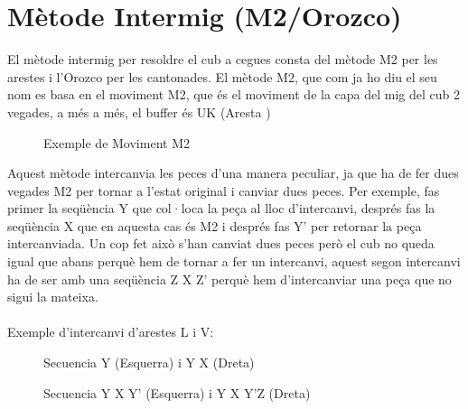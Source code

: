 \section{Mètode Intermig (M2/Orozco)}

El mètode intermig per resoldre el cub a cegues consta del mètode M2 per les arestes i l'Orozco per les cantonades.
El mètode M2, que com ja ho diu el seu nom es basa en el moviment M2, que és el moviment de la capa del mig del cub 2 vegades, a més a més, el buffer és UK (Aresta )

\begin{figure}[h]
    \centering\RubikCubeSolvedWY
    \caption{Exemple de Moviment M2}
\end{figure}
    
Aquest mètode intercanvia les peces d'una manera peculiar, ja que ha de fer dues vegades M2 per tornar a l'estat original i canviar dues peces. Per exemple, fas primer la seqüència Y que col·loca la peça al lloc d'intercanvi, després fas la seqüència X que en aquesta cas és M2 i després fas Y' per retornar la peça intercanviada. Un cop fet això s'han canviat dues peces però el cub no queda igual que abans perquè hem de tornar a fer un intercanvi, aquest segon intercanvi ha de ser amb una seqüència Z X Z' perquè hem d'intercanviar una peça que no sigui la mateixa.\\\\Exemple d'intercanvi d'arestes L i V:

\begin{figure}[htbp]
    \centering
    \begin{subfigure}
        \centering\RubikCubeSolvedWY
    \end{subfigure}
    \begin{subfigure}
        \centering\RubikCubeSolvedWY
    \end{subfigure}
    \caption{Secuencia Y (Esquerra) i Y X (Dreta)}
\end{figure}

\begin{figure}[htbp]
    \centering
    \begin{subfigure}
        \centering\RubikCubeSolvedWY
    \end{subfigure}
    \begin{subfigure}
        \centering\RubikCubeSolvedWY
    \end{subfigure}
    \caption{Secuencia Y X Y' (Esquerra) i Y X Y'Z (Dreta)}
\end{figure}

